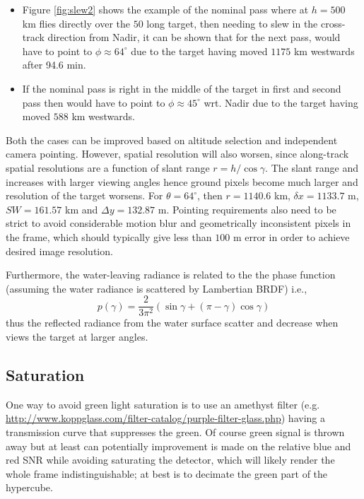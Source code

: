 \begin{itemize}
\item Figure \ref{fig:slew2} shows the example of the nominal pass where \sml at $h=500$ km flies directly over the $50$ long target, then needing to slew in the cross-track direction from Nadir, it can be shown that for the next pass, \hypso would have to point to $\phi \approx 64^{\circ}$ due to the target having moved $1175$ km westwards after 94.6 min. 

\item If the nominal \sml pass is right in the middle of the target in first and second pass then \sml would have to point to $\phi\approx 45^{\circ}$ wrt. Nadir due to the target having moved $588$ km westwards. 

\end{itemize}
Both the cases can be improved based on altitude selection and independent camera pointing. However, spatial resolution will also worsen, since along-track spatial resolutions are a function of slant range $r=h/\cos\gamma$. The slant range and increases with larger viewing angles hence ground pixels become much larger and resolution of the target worsens. For $\theta=64^{\circ}$, then $r=1140.6$ km, $\delta x=1133.7$ m, $SW =161.57$ km and $\Delta y=132.87$ m. Pointing requirements also need to be strict to avoid considerable motion blur and geometrically inconsistent pixels in the frame, which should typically give less than $100$ m error in order to achieve desired image resolution.

Furthermore, the water-leaving radiance is related to the the phase function (assuming the water radiance is scattered by Lambertian BRDF) i.e.,
\begin{equation}
p(\gamma) = \frac{2}{3\pi^2}\left(\sin\gamma + (\pi-\gamma)\cos\gamma \right)
\end{equation}
\noindent thus the reflected radiance from the water surface scatter and decrease when \hypso views the target at larger angles.

\subsection{Saturation}
One way to avoid green light saturation is to use an amethyst filter (e.g. \url{http://www.koppglass.com/filter-catalog/purple-filter-glass.php}) having a transmission curve that suppresses the green.  Of course green signal is thrown away but at least can potentially improvement is made on the relative blue and red SNR while avoiding saturating the detector, which will likely render the whole frame indistinguishable; at best is to decimate the green part of the hypercube.


